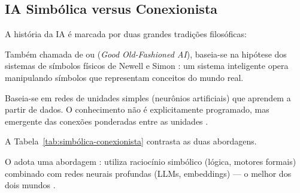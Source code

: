 \subsection{IA Simbólica versus Conexionista}
A história da IA é marcada por duas grandes tradições filosóficas:
\begin{definicao}[IA Simbólica]
Também chamada de  ou  (\textit{Good
Old-Fashioned AI}), baseia-se na hipótese dos sistemas de símbolos físicos
de Newell e Simon \cite{newell1976physical}: um sistema inteligente opera
manipulando símbolos que representam conceitos do mundo real.
\end{definicao}
\begin{definicao}[IA Conexionista]
Baseia-se em redes de unidades simples (neurônios artificiais) que aprendem
a partir de dados. O conhecimento não é explicitamente programado, mas
emergente das conexões ponderadas entre as unidades
\cite{mcculloch1943logical, rosenblatt1958perceptron}.
\end{definicao}
A Tabela~\ref{tab:simbólica-conexionista} contrasta as duas abordagens.
\begin{table}[htb]
\centering
    \small
\caption{IA Simbólica versus Conexionista}
\label{tab:simbólica-conexionista}
\end{table}
O \opencodeeco{} adota uma abordagem : utiliza
raciocínio simbólico (lógica, motores formais) combinado com redes neurais
profundas (LLMs, embeddings) --- o melhor dos dois mundos
\cite{opencode2026ecosystem}.

